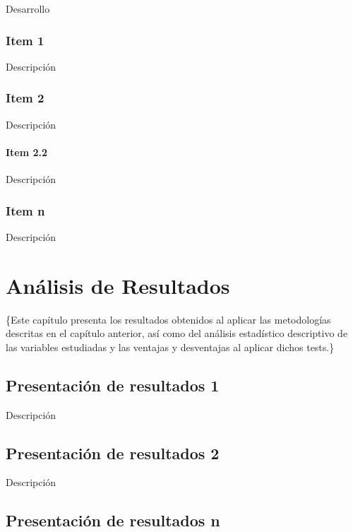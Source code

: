 \documentclass[oneside,11pt]{Latex/Classes/PhDthesisPSnPDF}
\begin{document}
Desarrollo\\

\subsection{Item 1}

Descripción\\

\subsection{Item 2}

Descripción\\

\subsubsection{Item 2.2}

Descripción\\

\subsection{Item n}

Descripción\\

\chapter{Análisis de Resultados}

\{\small Este capítulo presenta los resultados obtenidos al aplicar las
metodologías descritas en el capítulo anterior, así como del análisis
estadístico descriptivo de las variables estudiadas y las ventajas y
desventajas al aplicar dichos tests.\}

\section{Presentación de resultados 1}

Descripción\\

\section{Presentación de resultados 2}

Descripción\\

\section{Presentación de resultados n}
\end{document}
